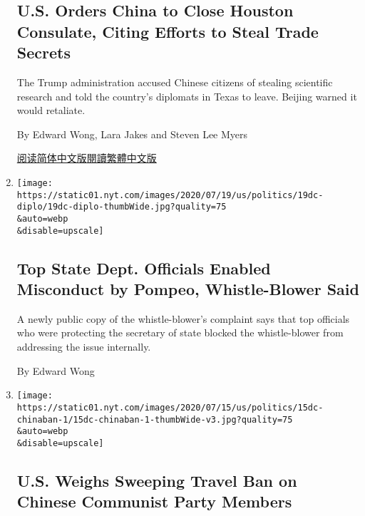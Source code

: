 \begin{enumerate}
{  \subsection{U.S. Orders China to Close Houston Consulate, Citing
  Efforts to Steal Trade
  Secrets}\label{us-orders-china-to-close-houston-consulate-citing-efforts-to-steal-trade-secrets}}

  The Trump administration accused Chinese citizens of stealing
  scientific research and told the country's diplomats in Texas to
  leave. Beijing warned it would retaliate.

  By Edward Wong, Lara Jakes and Steven Lee Myers

  \href{https://cn.nytimes.com/usa/20200722/us-china-houston-consulate/}{阅读简体中文版}\href{https://cn.nytimes.com/usa/20200722/us-china-houston-consulate/zh-hant/}{閱讀繁體中文版}
\item
  \href{/2020/07/19/us/politics/pompeo-whistleblower.html}{}

  \texttt{[image: https://static01.nyt.com/images/2020/07/19/us/politics/19dc-diplo/19dc-diplo-thumbWide.jpg?quality=75\\\&auto=webp\\\&disable=upscale]}

  \hypertarget{top-state-dept-officials-enabled-misconduct-by-pompeo-whistle-blower-said}{%
  \subsection{Top State Dept. Officials Enabled Misconduct by Pompeo,
  Whistle-Blower
  Said}\label{top-state-dept-officials-enabled-misconduct-by-pompeo-whistle-blower-said}}

  A newly public copy of the whistle-blower's complaint says that top
  officials who were protecting the secretary of state blocked the
  whistle-blower from addressing the issue internally.

  By Edward Wong
\item
  \href{/2020/07/15/us/politics/china-travel-ban.html}{}

  \texttt{[image: https://static01.nyt.com/images/2020/07/15/us/politics/15dc-chinaban-1/15dc-chinaban-1-thumbWide-v3.jpg?quality=75\\\&auto=webp\\\&disable=upscale]}

  \hypertarget{us-weighs-sweeping-travel-ban-on-chinese-communist-party-members}{%
  \subsection{U.S. Weighs Sweeping Travel Ban on Chinese Communist Party
  Members}\label{us-weighs-sweeping-travel-ban-on-chinese-communist-party-members}}


\end{enumerate}
